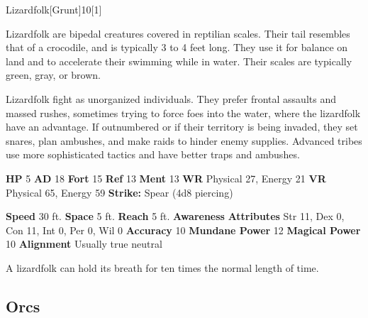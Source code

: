   \begin{monsection}{Lizardfolk}[Grunt]{10}[1]
    \vspace{-1em}\vspace{-1em}
    \vspace{0em}

    
    Lizardfolk are bipedal creatures covered in reptilian scales.
    Their tail resembles that of a crocodile, and is typically 3 to 4 feet long.
    They use it for balance on land and to accelerate their swimming while in water.
    Their scales are typically green, gray, or brown.

    Lizardfolk fight as unorganized individuals.
    They prefer frontal assaults and massed rushes, sometimes trying to force foes into the water, where the lizardfolk have an advantage.
    If outnumbered or if their territory is being invaded, they set snares, plan ambushes, and make raids to hinder enemy supplies.
    Advanced tribes use more sophisticated tactics and have better traps and ambushes.
  
    

    \begin{spellcontent}
      \begin{spelltargetinginfo}
        \pari \textbf{HP} 5 \monsep
          \textbf{AD} 18 \monsep
          \textbf{Fort} 15 \monsep
          \textbf{Ref} 13 \monsep
          \textbf{Ment} 13
        \pari \textbf{WR} Physical 27, Energy 21 \monsep
        \textbf{VR} Physical 65, Energy 59
        \pari \textbf{Strike:}
            Spear  (4d8 piercing)
      \end{spelltargetinginfo}
    \end{spellcontent}
    \begin{monsterfooter}
      \pari \textbf{Speed} 30 ft. \monsep
        \textbf{Space} 5 ft. \monsep
        \textbf{Reach} 5 ft.
      \pari \textbf{Awareness} 
      \pari \textbf{Attributes}
        Str 11, Dex 0,
        Con 11, Int 0,
        Per 0, Wil 0
      \pari \textbf{Accuracy} 10 \monsep
        \textbf{Mundane Power} 12 \monsep
      \textbf{Magical Power} 10
      \pari \textbf{Alignment} Usually true neutral
    \end{monsterfooter}
  \end{monsection}
   A lizardfolk can hold its breath for ten times the normal length of time.
  
    \subsection{Orcs}
      
